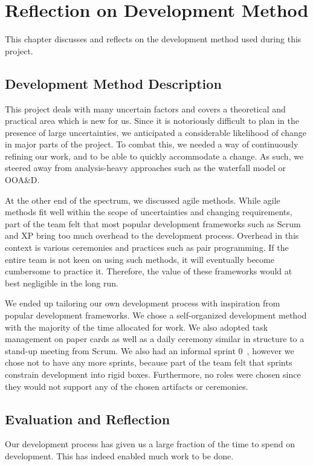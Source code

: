\chapter{Reflection on Development Method}\label{chap:devmethodreflection}
This chapter discusses and reflects on the development method used during this project. 

\section{Development Method Description}
This project deals with many uncertain factors and covers a theoretical and practical area which is new for us. Since it is notoriously difficult to plan in the presence of large uncertainties, we anticipated a considerable likelihood of change in major parts of the project. To combat this, we needed a way of continuously refining our work, and to be able to quickly accommodate a change. As such, we steered away from analysis-heavy approaches such as the waterfall model or OOA\&D\@.

At the other end of the spectrum, we discussed agile methods. While agile methods fit well within the scope of uncertainties and changing requirements, part of the team felt that most popular development frameworks such as Scrum and XP bring too much overhead to the development process. Overhead in this context is various ceremonies and practices such as pair programming. If the entire team is not keen on using such methods, it will eventually become cumbersome to practice it. Therefore, the value of these frameworks would at best negligible in the long run.

We ended up tailoring our own development process with inspiration from popular development frameworks. We chose a self-organized development method with the majority of the time allocated for work. We also adopted task management on paper cards as well as a daily ceremony similar in structure to a stand-up meeting from Scrum. We also had an informal sprint 0~\cite{sprint-zero}, however we chose not to have any more sprints, because part of the team felt that sprints constrain development into rigid boxes. Furthermore, no roles were chosen since they would not support any of the chosen artifacts or ceremonies.

\section{Evaluation and Reflection}
Our development process has given us a large fraction of the time to spend on development. This has indeed enabled much work to be done. 


